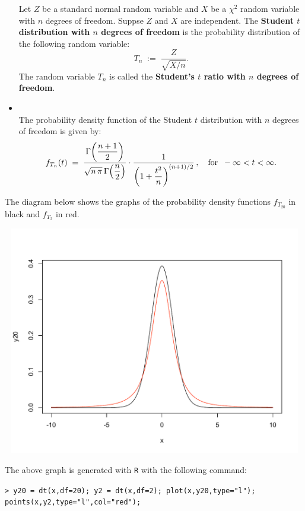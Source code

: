 \documentclass{article}
\begin{document}
\begin{itemize}
\begin{definition}
          Let $Z$ be a standard normal random variable and
          $X$ be a $\chi^{2}$ random variable with $n$ degrees of freedom.
          Suppse $Z$ and $X$ are independent.
          The \textbf{Student $t$ distribution with $n$ degrees of freedom} is the probability distribution of the following
          random variable:
          \begin{equation*}
          T_{n} \; := \; \dfrac{Z}{\sqrt{X/n}}.
          \end{equation*}
          The random variable $T_{n}$ is called the \textbf{Student's $t$ ratio with $n$ degrees of freedom}.
          \end{definition}
\item  \begin{theorem}\mbox{}\\
          The probability density function of the Student $t$ distribution with $n$ degrees of freedom is given by:
          \begin{equation*}
          f_{T_{n}}(t) \; = \; \dfrac{\Gamma\!\left(\dfrac{n+1}{2}\right)}{\sqrt{n\,\pi}\,\Gamma\!\left(\dfrac{n}{2}\right)}
                                      \cdot
                                      \dfrac{1}{\left(1+\dfrac{t^{2}}{n}\right)^{(n+1)/2}}\,,
          \quad\textnormal{for}\;\; -\infty < t < \infty.
          \end{equation*}
          \end{theorem}
\end{itemize}

The diagram below shows the graphs of the probability density functions $f_{T_{20}}$ in black and $f_{T_{2}}$ in red.
\begin{center}
\includegraphics[height=10.0cm,width=16cm]{StudentTDist-df20-df2.pdf}
\end{center}
The above graph is generated with \texttt{R} with the following command:
\begin{center}
\texttt{> y20 = dt(x,df=20); y2 = dt(x,df=2); plot(x,y20,type="l"); points(x,y2,type="l",col="red");}
\end{center}
\end{document}
